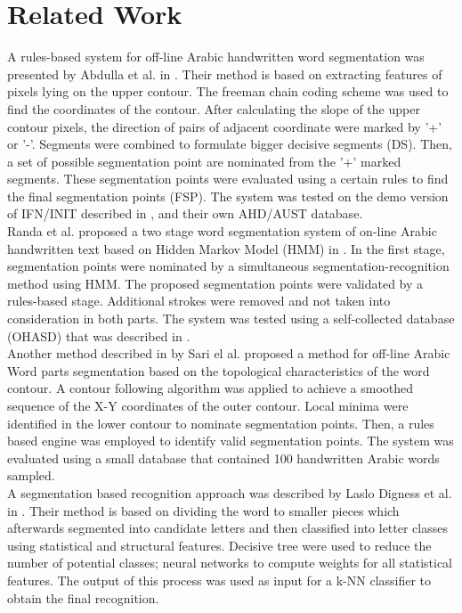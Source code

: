 \documentclass[journal,compsoc]{IEEEtran}
\begin{document}
\section{Related Work}
\label{sec:related_work}
A rules-based system for off-line Arabic handwritten word segmentation was presented by Abdulla et al. in \cite{abdulla2008off}. Their method is based on extracting features of pixels lying on the upper contour. The freeman chain coding scheme was used to find the coordinates of the contour. After calculating the slope of the upper contour pixels, the direction of pairs of adjacent coordinate were marked by '+' or '-'. Segments were combined to formulate bigger decisive segments (DS). Then, a set of possible segmentation point are nominated from the '+' marked segments. These segmentation points were evaluated using a certain rules to find the final segmentation points (FSP). The system was tested on the demo version of IFN/INIT described in \cite{pechwitz2002ifn} , and their own AHD/AUST database.\\

Randa et al. proposed a two stage word segmentation system of on-line Arabic handwritten text based on Hidden Markov Model (HMM) in \cite{elanwar2012unconstrained}. In the first stage, segmentation points were nominated by a simultaneous segmentation-recognition method using HMM. The proposed segmentation points were validated by a rules-based stage. Additional strokes were removed and not taken into consideration in both parts. The system was tested using a self-collected database (OHASD) that was described in \cite{elanwar2010ohasd}.\\

Another method described in \cite{sari2002off} by Sari el al. proposed a method for off-line Arabic Word parts segmentation based on the topological characteristics of the word contour. A contour following  algorithm was applied to achieve a smoothed sequence of the X-Y coordinates of the outer contour. Local minima were identified in the lower contour to nominate segmentation points. Then, a rules based engine was employed to identify valid segmentation points. The system was evaluated using a small database that contained 100 handwritten Arabic words sampled.\\

A segmentation based recognition approach was described by Laslo Digness et al. in \cite{Dinges2011}. Their method is based on dividing the word to smaller pieces which afterwards segmented into candidate letters and then classified into letter classes using statistical and structural features. Decisive tree were used to reduce the number of potential classes; neural networks to compute weights for all statistical features. The output of this process was used as input for a k-NN classifier to obtain the final recognition.\\
\end{document}

